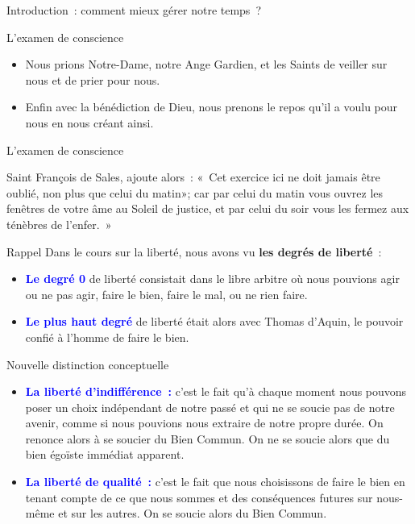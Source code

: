 \documentclass[11pt,xcolor=dvipsname,ignorenonframetext,handout]{beamer}
\begin{document}
\begin{frame}{Introduction~: comment mieux gérer notre temps~?}
\begin{frame}{L'examen de conscience}
\begin{itemize}
        \item Nous prions Notre-Dame, notre Ange Gardien, et les Saints de veiller sur nous et de prier pour nous.
        \item Enfin avec la bénédiction de Dieu, nous prenons le repos qu'il a voulu pour nous en nous créant ainsi.
\end{itemize}
\end{frame}
\begin{frame}{L'examen de conscience}
\begin{block}{Saint François de Sales, ajoute alors~:}
\rightskip=0pt\leftskip=0pt
«~Cet exercice ici ne doit jamais être oublié, non plus que celui du matin»; car par celui du matin vous ouvrez les fenêtres de votre âme au Soleil de justice, et par celui du soir vous les fermez aux ténèbres de l'enfer.~»
\end{block}
\end{frame}
\begin{frame}{Rappel}
    \rightskip=0pt\leftskip=0pt
    Dans le cours sur la liberté, nous avons vu \textbf{les degrés de liberté}~:
    \begin{itemize}
        \rightskip=0pt\leftskip=0pt
        \item \textcolor{blue}{\textbf{Le degré 0}} de liberté consistait dans le libre arbitre où nous pouvions agir ou ne pas agir, faire le bien, faire le mal, ou ne rien faire.
        \item \textcolor{blue}{\textbf{Le plus haut degré}} de liberté était alors avec Thomas d'Aquin, le pouvoir confié à l'homme de faire le bien.
    \end{itemize}
\end{frame}
\begin{frame}{Nouvelle distinction conceptuelle}
    \begin{itemize}
        \rightskip=0pt\leftskip=0pt
        \item \textcolor{blue}{\textbf{La liberté d'indifférence~:}} c'est le fait qu'à chaque moment nous pouvons poser un choix indépendant de notre passé et qui ne se soucie pas de notre avenir, comme si nous pouvions nous extraire de notre propre durée. On renonce alors à se soucier du Bien Commun. On ne se soucie alors que du bien égoïste immédiat apparent.
        \item \textcolor{blue}{\textbf{La liberté de qualité~:}} c'est le fait que nous choisissons de faire le bien en tenant compte de ce que nous sommes et des conséquences futures sur nous-même et sur les autres. On se soucie alors du Bien Commun.

\end{itemize}
\end{frame}
\end{frame}
\end{document}

